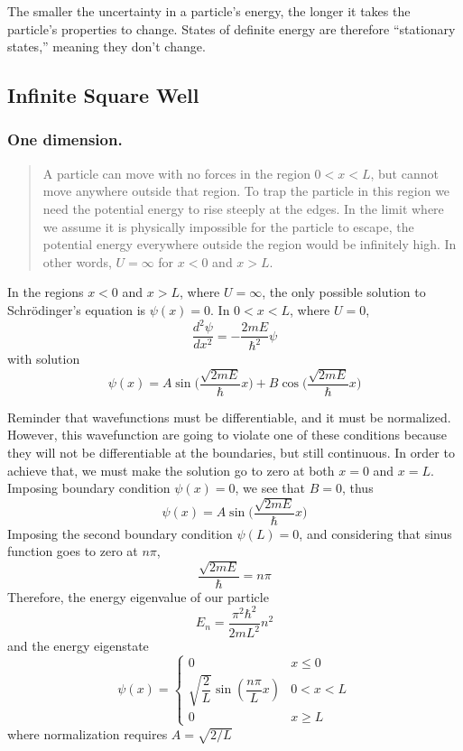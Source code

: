 \documentclass[../../main.tex]{subfiles}
\begin{document}
The smaller the uncertainty in a particle's energy, the longer it takes the particle's properties to change. States of definite energy are therefore “stationary states,” meaning they don't change.

\subsection{Infinite Square Well}
\subsubsection{One dimension.} \begin{quote}
    A particle can move with no forces in the region $0 < x < L$, but cannot move anywhere outside that region. To trap the particle in this region we need the potential energy to rise steeply at the edges. In the limit where we assume it is physically impossible for the particle to escape, the potential energy everywhere outside the region would be infinitely high. In other words, $U=\infty$ for $x < 0$ and $x > L$.
\end{quote} 
In the regions $x < 0$ and $x > L$, where $U = \infty$, the only possible solution to Schrödinger's equation is $\psi(x) = 0$. In $0 < x < L$, where $ U = 0$, 
\begin{equation*}
    \frac{d^2\psi}{dx^2}=-\frac{2mE}{\hbar^2}\psi
\end{equation*}
with solution
\begin{equation*}
    \psi(x)=A\sin \biggl(\frac{\sqrt{2mE}}{\hbar} x\biggr)+ B \cos \biggl(\frac{\sqrt{2mE}}{\hbar} x\biggr)
\end{equation*}

Reminder that wavefunctions must be differentiable, and it must be normalized. However, this wavefunction are going to violate one of these conditions because they will not be differentiable at the boundaries, but still continuous. In order to achieve that, we must make the solution go to zero at both $x = 0$ and $x = L$. Imposing boundary condition $\psi(x)=0$, we see that $B=0$, thus
\begin{equation*}
    \psi(x)=A\sin \biggl(\frac{\sqrt{2mE}}{\hbar} x\biggr)
\end{equation*}
Imposing the second boundary condition $\psi(L)=0$, and considering that sinus function goes to zero at $n\pi$, 
\begin{equation*}
    \frac{\sqrt{2mE}}{\hbar}=n\pi
\end{equation*}
Therefore, the energy eigenvalue of our particle 
\begin{equation*}
    E_n=\frac{\pi^2\hbar^2}{2mL^2}n^2
\end{equation*}
and the energy eigenstate
\begin{equation*}
    \psi(x)=\begin{cases}
        0&x\leq 0\\
        \sqrt{\dfrac{2}{L}}\sin( \dfrac{n\pi}{L}x)& 0 < x < L\\
        0&x\geq L
    \end{cases}
\end{equation*}
where normalization requires $A = \sqrt{2/L}$
\end{document}
